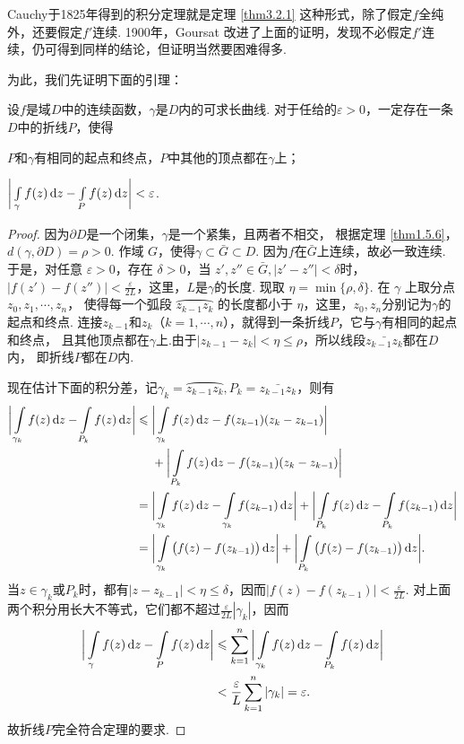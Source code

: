 Cauchy于1825年得到的积分定理就是定理 \ref{thm3.2.1} 这种形式，除了假定$f$全纯外，还要假定$f'$连续.
1900年，Goursat 改进了上面的证明，发现不必假定$f'$连续，仍可得到同样的结论，但证明当然要困难得多.

为此，我们先证明下面的引理：
\begin{lemma}\label{lemma3.2.2}
  设$f$是域$D$中的连续函数，$\gamma$是$D$内的可求长曲线.
  对于任给的$\varepsilon>0$，一定存在一条$D$中的折线$P$，使得
  \begin{eenum}
    \item $P$和$\gamma$有相同的起点和终点，$P$中其他的顶点都在$\gamma$上；
    \item $\bigg|\int\limits_\gamma f(z)\mathop{}\!\mathrm dz-\int\limits_Pf(z)\mathop{}\!\mathrm dz\bigg|<\varepsilon$.
  \end{eenum}
\end{lemma}
\begin{proof}
  因为$\partial D$是一个闭集，$\gamma$是一个紧集，且两者不相交，
  根据定理 \ref{thm1.5.6}，$d(\gamma,\partial D)=\rho>0$.
  作域 $G$，使得$\gamma\subset\bar G\subset D$. 因为$f$在$\bar G$上连续，故必一致连续.
  于是，对任意 $\varepsilon>0$，存在 $\delta>0$，当 $z',z''\in\bar G,|z'-z''|<\delta$时，
  $|f(z')-f(z'')|<\frac{\varepsilon}{2L}$，这里，$L$是$\gamma$的长度.
  现取 $\eta=\min\{\rho,\delta\}$. 在 $\gamma$ 上取分点 $z_0,z_1,\cdots,z_n$，
  使得每一个弧段 $\wideparen{z_{k-1}z_k}$ 的长度都小于 $\eta$，这里，$z_0,z_n$分别记为$\gamma$的起点和终点.
  连接$z_{k-1}$和$z_k$（$k=1,\cdots,n$），就得到一条折线$P$，它与$\gamma$有相同的起点和终点，
  且其他顶点都在$\gamma$上.由于$|z_{k-1}-z_k|<\eta\le\rho$，所以线段$\bar{z_{k-1}z_k}$都在$D$内，
  即折线$P$都在$D$内.

  现在估计下面的积分差，记$\gamma_k=\wideparen{z_{k-1}z_k},P_k=\bar{z_{k-1}z_k}$，则有
  \begin{align*}
    \bigg|\int\limits_{\gamma_k} f(z)\dz-\int\limits_{P_k}f(z)\dz\bigg|\le{}
        & \bigg|\int\limits_{\gamma_k} f(z)\dz-f(z_{k-1})(z_k-z_{k-1})\bigg| \\
        & + \bigg|\int\limits_{P_k} f(z)\dz-f(z_{k-1})(z_k-z_{k-1})\bigg| \\
    ={} & \bigg|\int\limits_{\gamma_k} f(z)\dz-\int\limits_{\gamma_k} f(z_{k-1})\dz\bigg|
        + \bigg|\int\limits_{P_k} f(z)\dz-\int\limits_{P_k} f(z_{k-1})\dz\bigg| \\
    ={} & \bigg|\int\limits_{\gamma_k}\big(f(z)-f(z_{k-1})\big)\dz\bigg|
        + \bigg|\int\limits_{P_k}\big(f(z)-f(z_{k-1})\big)\dz\bigg|.
\end{align*}
  当$z\in\gamma_k$或$P_k$时，都有$|z-z_{k-1}|<\eta\le\delta$，因而$|f(z)-f(z_{k-1})|
  <\frac{\varepsilon}{2L}$. 对上面两个积分用长大不等式，它们都不超过$\frac{\varepsilon}{2L}|\gamma_k|$，因而
  \begin{align*}
    \bigg|\int\limits_\gamma f(z)\mathop{}\!\mathrm dz - \int\limits_Pf(z)\mathop{}\!\mathrm dz\bigg|
    & \leqslant
    \sum_{k=1}^n\bigg|\int\limits_{\gamma_k} f(z)\mathop{}\!\mathrm dz - \int\limits_{P_k}f(z)\mathop{}\!\mathrm dz\bigg|\\
    & < \frac{\varepsilon}{L}\sum_{k=1}^n|\gamma_k|=\varepsilon.
  \end{align*}
  故折线$P$完全符合定理的要求.
\end{proof}


